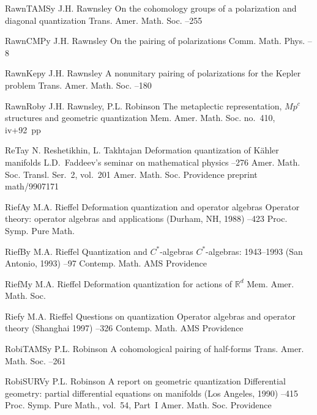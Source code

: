 \documentclass[11pt]{amsart}
\numberwithin{equation}{section}
\theoremstyle{remark}
\newcommand\RR{\mathbb R}
\newcommand{\by}{\mathbf y}
\begin{document}
\begin{thebibliography}{199}
 RawnTAMS\by{ J.H. Rawnsley \paper On the cohomology groups of a
polarization and diagonal quantization \jour Trans. Amer. Math. Soc. 
 --255}

 RawnCMP\by{ J.H. Rawnsley \paper On the pairing of polarizations \jour
Comm. Math. Phys.   --8}

 RawnKep\by{ J.H. Rawnsley \paper A nonunitary pairing of polarizations
for the Kepler problem \jour Trans. Amer. Math. Soc.   --180}

 RawnRob\by{ J.H. Rawnsley, P.L. Robinson \paper The metaplectic
representation, $Mp^c$ structures and geometric quantization \jour Mem. Amer.
Math. Soc.   \pages no.~410, iv+92~pp}

 ReTa\by{ N. Reshetikhin, L. Takhtajan \paper Deformation quantization
of K\"ahler manifolds \inbook L.D.~Faddeev's seminar on mathematical physics
--276 \bookinfo Amer. Math. Soc. Transl. Ser.~2, vol.~201 \publ Amer.
Math. Soc. \publaddr Providence  \paperinfo preprint math/9907171}

 RiefA\by{ M.A. Rieffel \paper Deformation quantization and operator
algebras \inbook Operator theory: operator algebras and applications (Durham,
NH, 1988) --423 \bookinfo Proc. Symp. Pure Math.  }

 RiefB\by{ M.A. Rieffel \paper Quantization and $C^*$-algebras \inbook
$C^*$-algebras: 1943--1993 (San Antonio, 1993) --97 \bookinfo Contemp.
Math.  \publ AMS \publaddr Providence }

 RiefM\by{ M.A. Rieffel \paper Deformation quantization for actions of
$\RR^d$ \jour Mem. Amer. Math. Soc.   }

 Rief\by{ M.A. Rieffel \paper Questions on quantization \inbook Operator
algebras and operator theory (Shanghai 1997) --326 \bookinfo Contemp.
Math.  \publ AMS \publaddr Providence }

 RobiTAMS\by{ P.L. Robinson \paper A cohomological pairing of half-forms
\jour Trans. Amer. Math. Soc.   --261}

 RobiSURV\by{ P.L. Robinson \paper A report on geometric quantization
\inbook Differential geometry: partial differential equations on manifolds
(Los Angeles, 1990) --415 \bookinfo Proc. Symp. Pure Math., vol.~54,
Part~I \publ Amer. Math. Soc. \publaddr Providence }


\end{thebibliography}
\end{document}
